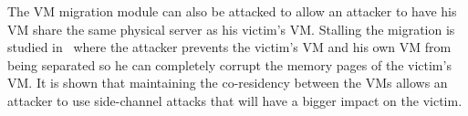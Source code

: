 The VM migration module can also be attacked to allow an attacker to have his VM share the same physical server as his victim's VM. Stalling the migration is studied in~\cite{stalling-atya2017} where the attacker prevents the victim's VM and his own VM from being separated so he can completely corrupt the memory pages of the victim's VM. It is shown that maintaining the co-residency between the VMs allows an attacker to use side-channel attacks that will have a bigger impact on the victim.

\begin{table}[ht]
\end{table}

